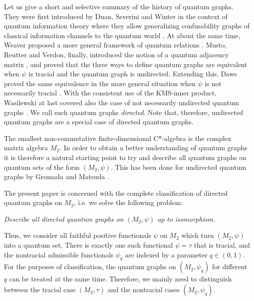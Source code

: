 \documentclass{amsart}
\begin{document}
Let us give a short and selective summary of the history of quantum graphs.
They were first introduced by Duan, Severini and Winter in the context of quantum information theory where they allow generalizing confusability graphs of classical information channels to the quantum world \cite{duan_zero-error_2013}. At about the same time, Weaver proposed a more general framework of quantum relations \cite{weaver_quantum_2012}. Musto, Reutter and Verdon, finally, introduced the notion of a quantum adjacency matrix \cite{musto_compositional_2018}, and proved that the three ways to define quantum graphs are equivalent when $\psi$ is tracial and the quantum graph is undirected. Extending this, Daws proved the same equivalence in the more general situation when $\psi$ is not necessarily tracial \cite{daws_quantum_2024}. With the consistent use of the KMS-inner product, Wasilewski at last covered also the case of not necessarily undirected quantum graphs \cite{wasilewski_quantum_2024}. We call such quantum graphs \emph{directed}. Note that, therefore, undirected quantum graphs are a special case of directed quantum graphs.



The smallest non-commutative finite-dimensional C*-algebra is the complex matrix algebra $M_2$. In order to obtain a better understanding of quantum graphs it is therefore a natural starting point to try and describe all quantum graphs on quantum sets of the form $(M_2, \psi)$. This has been done for undirected quantum graphs by Gromada and Matsuda \cite{gromada_examples_2022, matsuda_classification_2022}.

The present paper is concerned with the complete classification of directed quantum graphs on $M_2$, i.e. we solve the following problem:
\begin{center}
    \textit{Describe all directed quantum graphs on $(M_2, \psi)$ up to isomorphism.}
\end{center}
Thus, we consider all faithful positive functionals $\psi$ on $M_2$ which turn $(M_2, \psi)$ into a quantum set. There is exactly one such functional $\psi = \tau$ that is tracial, and the nontracial admissible functionals $\psi_q$ are indexed by a parameter $q \in (0,1)$. For the purposes of classification, the quantum graphs on $(M_2, \psi_q)$ for different $q$ can be treated at the same time. Therefore, we mainly need to distinguish between the tracial case $(M_2, \tau)$ and the nontracial cases $(M_2, \psi_q)$.
\end{document}
